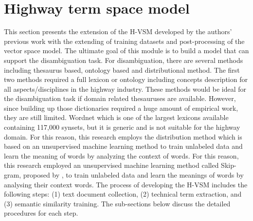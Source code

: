 \documentclass[Journal, InsideFigs, DoubleSpace]{ascelike} %
\begin{document}
\section{Highway term space model} \label{sec:vector-space}
%
This section presents the extension of the H-VSM developed by the authors' previous work with the extending of training datasets and post-processing of the vector space model. The ultimate goal of this module is to build a model that can support the disambiguation task. For disambiguation, there are several methods including thesaurus based, ontology based and distributional method. The first two methods required a full lexicon or ontology including concepts description for all aspects/disciplines in the highway industry. These methods would be ideal for the disambiguation task if domain related thesauruses are available. However, since building up those dictionaries required a huge amount of empirical work, they are still limited. Wordnet \cite{miller95} which is one of the largest lexicons available containing 117,000 synsets, but it is generic and is not suitable for the highway domain. For this reason, this research employs the distribution method which is based on an unsupervised machine learning method to train unlabeled data and learn the meaning of words by analyzing the context of words. For this reason, this research employed an unsupervised machine learning method called Skip-gram, proposed by \cite{mikolov13a}, to train unlabeled data and learn the meanings of words by analysing their context words. The process of developing the H-VSM includes the following steps: (1) text document collection, (2) technical term extraction, and (3) semantic similarity training. The sub-sections below discuss the detailed procedures for each step. 
%
\end{document}
